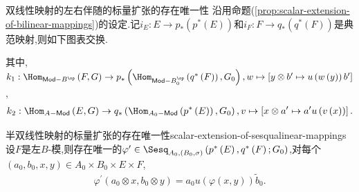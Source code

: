 \begin{proposition}{双线性映射的左右伴随的标量扩张的存在唯一性}{}
	沿用命题(\cref{prop:scalar-extension-of-bilinear-mappings})的设定.记$i_{E}:E\to p_{\ast}\left(p^{\ast}\left(E\right)\right)$和$i_{F}:F\to q_{\ast}\left(q^{\ast}\left(F\right)\right)$是典范映射,则如下图表交换.
	\begin{center}
	\end{center}
	其中,$k_{1}:\Hom_{\mathsf{Mod}-B^{\op}}\left(F,G\right)\to p_{\ast}\left(\Hom_{\mathsf{Mod}-B_{0}^{\op}}\left(q^{\ast}\left(F\right)\right),G_{0}\right),w\mapsto\left[y\otimes b^{\prime}\mapsto u\left(w\left(y\right)\right)b^{\prime}\right]$,
	\begin{align*}
		k_{2}:\Hom_{A-\mathsf{Mod}}\left(E,G\right)\to q_{\ast}\left(\Hom_{A_{0}-\mathsf{Mod}}\left(p^{\ast}\left(E\right)\right),G_{0}\right),v\mapsto\left[x\otimes a^{\prime}\mapsto  a^{\prime}u\left(v\left(x\right)\right)\right].
	\end{align*}
\end{proposition}

\begin{proposition}{半双线性映射的标量扩张的存在唯一性}{scalar-extension-of-sesqualinear-mappings}
	设$F$是左$B$-模,则存在唯一的$\varphi^{\prime}\in\Sesq_{A_{0},(B_{0},\sigma)}\left(p^{\ast}\left(E\right),q^{\ast}\left(F\right);G_{0}\right)$,对每个$\left(a_{0},b_{0},x,y\right)\in A_{0}\times B_{0}\times E\times F$,
	\begin{align*}
		\varphi^{\prime}\left(a_{0}\otimes x,b_{0}\otimes y\right)=a_{0}u\left(\varphi\left(x,y\right)\right)\tilde{b}_{0}.
	\end{align*}
\end{proposition}

